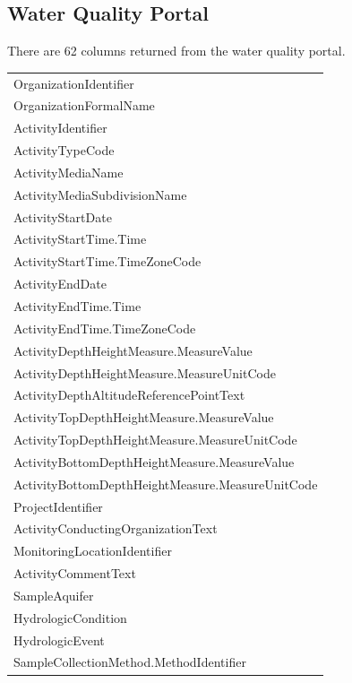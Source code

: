 \documentclass[a4paper,11pt]{article}
\begin{document}
\subsection{Water Quality Portal}
\label{sec:appendix2WQP}

There are 62 columns returned from the water quality portal. 

\begin{tabular}{l}
  \hline
  \hline
OrganizationIdentifier \\ 
  OrganizationFormalName \\ 
  ActivityIdentifier \\ 
  ActivityTypeCode \\ 
  ActivityMediaName \\ 
  ActivityMediaSubdivisionName \\ 
  ActivityStartDate \\ 
  ActivityStartTime.Time \\ 
  ActivityStartTime.TimeZoneCode \\ 
  ActivityEndDate \\ 
  ActivityEndTime.Time \\ 
  ActivityEndTime.TimeZoneCode \\ 
  ActivityDepthHeightMeasure.MeasureValue \\ 
  ActivityDepthHeightMeasure.MeasureUnitCode \\ 
  ActivityDepthAltitudeReferencePointText \\ 
  ActivityTopDepthHeightMeasure.MeasureValue \\ 
  ActivityTopDepthHeightMeasure.MeasureUnitCode \\ 
  ActivityBottomDepthHeightMeasure.MeasureValue \\ 
  ActivityBottomDepthHeightMeasure.MeasureUnitCode \\ 
  ProjectIdentifier \\ 
  ActivityConductingOrganizationText \\ 
  MonitoringLocationIdentifier \\ 
  ActivityCommentText \\ 
  SampleAquifer \\ 
  HydrologicCondition \\ 
  HydrologicEvent \\ 
  SampleCollectionMethod.MethodIdentifier \\ 

\end{tabular}
\end{document}

